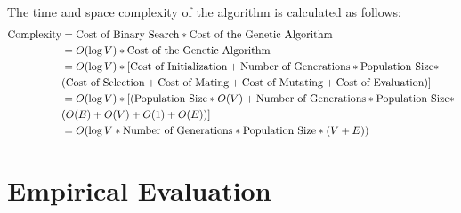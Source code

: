 \documentclass[acmlarge]{acmart}
\begin{document}
The time and space complexity of the algorithm is calculated as follows:
\vspace{-.5cm}
\begin{align*}
    \textnormal{Complexity} &= \textnormal{Cost of Binary Search} * \textnormal{Cost of the Genetic Algorithm}\\
    &= O(\log V) * \textnormal{Cost of the Genetic Algorithm}\\
    &= O(\log V) * [\textnormal{Cost of Initialization} + \textnormal{Number of Generations} * \textnormal{Population Size} * \\
    &(\textnormal{Cost of Selection} + \textnormal{Cost of Mating} + \textnormal{Cost of Mutating} + \textnormal{Cost of Evaluation})]\\
    &= O(\log V) * [(\textnormal{Population Size} * O(V) + \textnormal{Number of Generations} * \textnormal{Population Size} * \\
    &(O(E) + O(V) + O(1) + O(E))]\\
    &= O(\log V * \textnormal{Number of Generations} * \textnormal{Population Size} * (V + E))\\
\end{align*}


\section{Empirical Evaluation}
\end{document}
